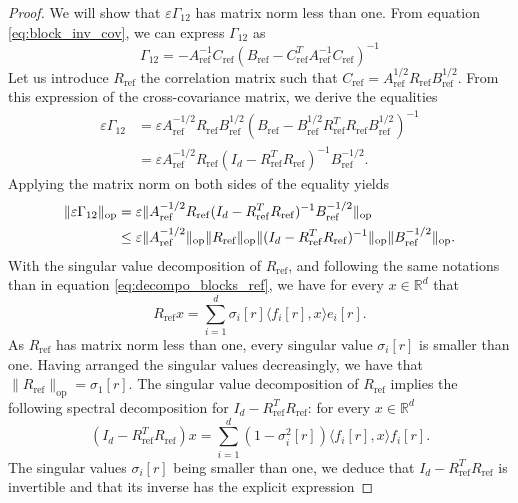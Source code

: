 \documentclass[]{article}
\DeclareMathOperator{\op}{op}
\DeclareMathOperator{\refe}{ref}
\numberwithin{equation}{section}
\theoremstyle{plain}
\begin{document}
\begin{proof}
	We will show that $\varepsilon \Gamma_{12}$ has matrix norm less than one. From equation \ref{eq:block_inv_cov}, we can express $\Gamma_{12}$ as
	\begin{equation*}
		\Gamma_{12} = -A^{-1}_{\refe}C_{\refe}(B_{\refe} - C_{\refe}^TA_{\refe}^{-1}C_{\refe})^{-1}
	\end{equation*} 
	Let us introduce $R_{\refe}$ the correlation matrix such that $C_{\refe} = A_{\refe}^{1/2} R_{\refe} B_{\refe}^{1/2}$. From this expression of the cross-covariance matrix, we derive the equalities
	\begin{align*}
		\varepsilon \Gamma_{12} &=  \varepsilon A_{\refe}^{-1/2} R_{\refe}B_{\refe}^{1/2}(B_{\refe}- B_{\refe}^{1/2} R_{\refe}^T R_{\refe} B_{\refe}^{1/2})^{-1} \\
		& =  \varepsilon A_{\refe}^{-1/2} R_{\refe}(I_d- R_{\refe}^T R_{\refe})^{-1} B_{\refe}^{-1/2}.
	\end{align*}
	Applying the matrix norm on both sides of the equality yields
	\begin{align}\label{eq:upper_bound_norm_gamma}
		\|\varepsilon \Gamma_{12}\|_{\rm op}& = \varepsilon \|A_{\refe}^{-1/2} R_{\refe}(I_d- R_{\refe}^T R_{\refe})^{-1} B_{\refe}^{-1/2}\|_{\op} \nonumber\\
		& \leq \varepsilon  \|A_{\refe}^{-1/2}\|_{\op} \| R_{\refe}\|_{\op} \|(I_d- R_{\refe}^T R_{\refe})^{-1}\|_{\op} \|B_{\refe}^{-1/2}\|_{\op}.
	\end{align}
	With the singular value decomposition of $R_{\refe}$, and following the same notations than in equation \eqref{eq:decompo_blocks_ref}, we have for every $x \in \mathbb{R}^d$ that
	\begin{equation}
		R_{\refe} x = \sum_{i=1}^d \sigma_i[r] \langle f_i[r],x \rangle e_i[r].
	\end{equation}
	As $R_{\refe}$ has matrix norm less than one, every singular value $\sigma_i[r]$ is smaller than one. Having arranged the singular values decreasingly, we have that $\|R_{\refe}\|_{\op}= \sigma_1[r]$.
	The singular value decomposition of $R_{\refe}$ implies the following spectral decomposition for $I_d - R_{\refe}^T R_{\refe}$: for every $x \in \mathbb{R}^d$
	\begin{equation}
		(I_d - R_{\refe}^T R_{\refe})x = \sum_{i=1}^d (1 - \sigma_i^2[r]) \langle f_i[r], x \rangle f_i[r].
	\end{equation}
	The singular values $\sigma_i[r]$ being smaller than one, we deduce that $I_d - R_{\refe}^T R_{\refe}$ is invertible and that its inverse has the explicit expression

\end{proof}
\end{document}
